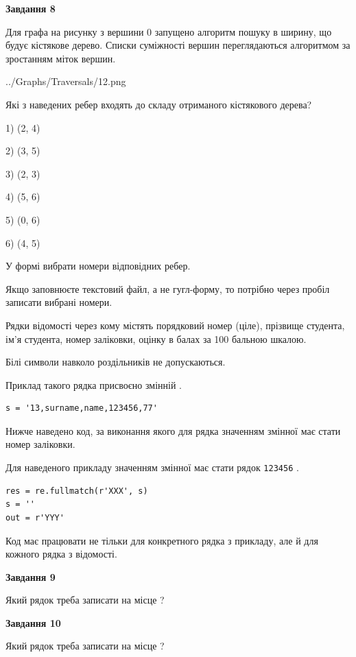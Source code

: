 \documentclass[12pt, ukrainian]{article}
\def\code#1{\Verb!#1!}
\begin{document}
{\begin {large}
{\begin {center}\textbf{Завдання 8}\end {center}}\par
Для графа на рисунку з вершини 0 запущено алгоритм пошуку в ширину, що будує кістякове дерево. Списки суміжності вершин переглядаються алгоритмом за зростанням міток вершин.\par
\begin{center}
	{../Graphs/Traversals/12.png}
\end{center}
\par Які з наведених ребер входять до складу отриманого кістякового дерева?\par
1) (2, 4)\par
2) (3, 5)\par
3) (2, 3)\par
4) (5, 6)\par
5) (0, 6)\par
6) (4, 5)\par
{\vskip 15pt} У формі вибрати номери відповідних ребер.


Якщо заповнюєте текстовий файл, а не гугл-форму, то потрібно через пробіл записа\-ти вибрані номери.\par
\newpage


Рядки відомості через кому містять порядковий номер (ціле), пріз\-ви\-ще студен\-та, ім'я студента, номер заліковки, оцінку в балах за 100 бальною шкалою.

Білі символи навколо роздільників не допускаються.

Приклад такого рядка присвоєно змінній .



\begin{verbatim}
s = '13,surname,name,123456,77'
\end{verbatim}


Нижче наведено код, за виконання якого для рядка  значенням змінної  має стати номер заліковки.

Для наведеного прикладу значенням змінної  має стати рядок \code{123456} .



\begin{verbatim}
res = re.fullmatch(r'XXX', s)
s = ''
out = r'YYY'
\end{verbatim}


Код має працювати не тільки для конкретного рядка з прикладу, але й для кожного рядка з відомості.

{\begin {center}\textbf{Завдання 9}\end {center}}\par
Який рядок треба записати на місце  ?\par
\vspace{5mm}


{\begin {center}\textbf{Завдання 10}\end {center}}\par
Який рядок треба записати на місце  ?\par


\newpage


\end {large}}
\end{document}
